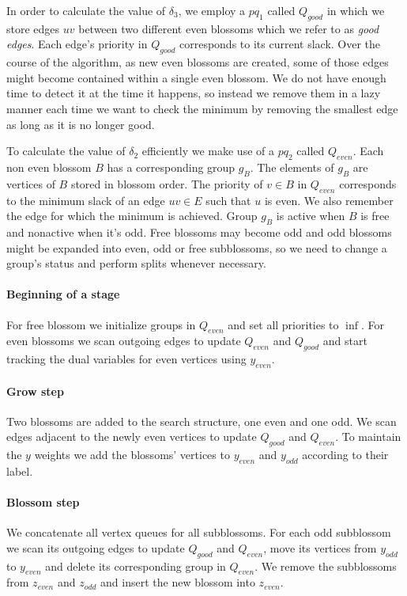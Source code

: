 In order to calculate the value of $\delta_3$, we employ a $pq_1$ called $Q_{good}$ in which we store edges $uv$ between two different even blossoms which we refer to as \textit{good edges}. Each edge's priority in $Q_{good}$ corresponds to its current slack. Over the course of the algorithm, as new even blossoms are created, some of those edges might become contained within a single even blossom. We do not have enough time to detect it at the time it happens, so instead we remove them in a lazy manner each time we want to check the minimum by removing the smallest edge as long as it is no longer good.

To calculate the value of $\delta_2$ efficiently we make use of a $pq_2$ called $Q_{even}$. Each non even blossom $B$ has a corresponding group $g_B$. The elements of $g_B$ are vertices of $B$ stored in blossom order. The priority of $v \in B$ in $Q_{even}$ corresponds to the minimum slack of an edge $uv \in E$ such that $u$ is even. We also remember the edge for which the minimum is achieved. Group $g_B$ is active when $B$ is free and nonactive when it's odd. Free blossoms may become odd and odd blossoms might be expanded into even, odd or free subblossoms, so we need to change a group's status and perform splits whenever necessary.

\paragraph*{Beginning of a stage} For free blossom we initialize groups in $Q_{even}$ and set all priorities to $\inf$. For even blossoms we  scan outgoing edges to update $Q_{even}$ and $Q_{good}$ and start tracking the dual variables for even vertices using $y_{even}$.

\paragraph*{Grow step} Two blossoms are added to the search structure, one even and one odd. We scan edges adjacent to the newly even vertices to update $Q_{good}$ and $Q_{even}$. To maintain the $y$ weights we add the blossoms' vertices to $y_{even}$ and $y_{odd}$ according to their label.

\paragraph*{Blossom step} We concatenate all vertex queues for all subblossoms. For each odd subblossom we scan its outgoing edges to update $Q_{good}$ and $Q_{even}$, move its vertices from $y_{odd}$ to $y_{even}$ and delete its corresponding group in $Q_{even}$. We remove the subblossoms from $z_{even}$ and $z_{odd}$ and insert the new blossom into $z_{even}$.


